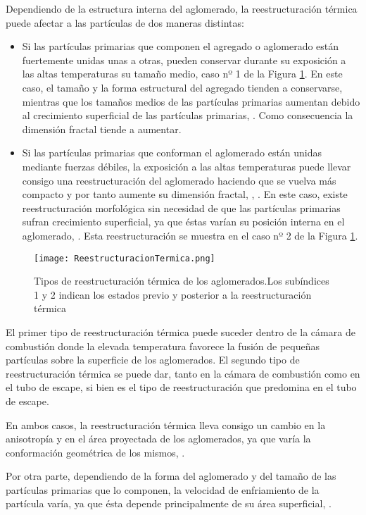 \par Dependiendo de la estructura interna del aglomerado, la reestructuración térmica puede afectar a las partículas de dos maneras distintas:

\begin{itemize}
\item Si las partículas primarias que componen el agregado o aglomerado están fuertemente unidas unas a otras, pueden conservar durante su exposición a las altas temperaturas su tamaño medio, caso nº 1 de la Figura \ref{fig:reestructuraciontermica}. En este caso, el tamaño y la forma estructural del agregado tienden a conservarse, mientras que los tamaños medios de las partículas primarias aumentan debido al crecimiento superficial de las partículas primarias, \cite{sempereetal:1993}. Como consecuencia la dimensión fractal tiende a aumentar.

\item Si las partículas primarias que conforman el aglomerado están unidas mediante fuerzas débiles, la exposición a las altas temperaturas puede llevar consigo una reestructuración del aglomerado haciendo que se vuelva más compacto y por tanto aumente su dimensión fractal, \cite{stasio:2001}, \cite{dalisetal:2005}. En este caso, existe reestructuración morfológica sin necesidad de que las partículas primarias sufran crecimiento superficial, ya que éstas varían su posición interna en el aglomerado, \cite{schmidt:1988,liuetal:2004}. Esta reestructuración se muestra en el caso nº 2 de la Figura \ref{fig:reestructuraciontermica}.

\end{itemize}

\begin{figure}[ht]
\centering
	\texttt{[image: ReestructuracionTermica.png]}	 
	\caption[Tipos de reestructuración térmica de los aglomerados]{Tipos de reestructuración térmica de los aglomerados.Los subíndices 1 y 2 indican los estados previo y posterior a la reestructuración térmica} \label{fig:reestructuraciontermica}
\end{figure} 

\par El primer tipo de reestructuración térmica puede suceder dentro de la cámara de combustión donde la elevada temperatura favorece la fusión de pequeñas partículas sobre la superficie de los aglomerados. El segundo tipo de reestructuración térmica se puede dar, tanto en la cámara de combustión como en el tubo de escape, si bien es el tipo de reestructuración que predomina en el tubo de escape.
\par En ambos casos, la reestructuración térmica lleva consigo un cambio en la anisotropía y en el área proyectada de los aglomerados, ya que varía la conformación geométrica de los mismos, \cite{mikhailovetal:1996}.
\par Por otra parte, dependiendo de la forma del aglomerado y del tamaño de las partículas primarias que lo componen, la velocidad de enfriamiento de la partícula varía, ya que ésta depende principalmente de su área superficial, \cite{liuetal:2004}.
 

